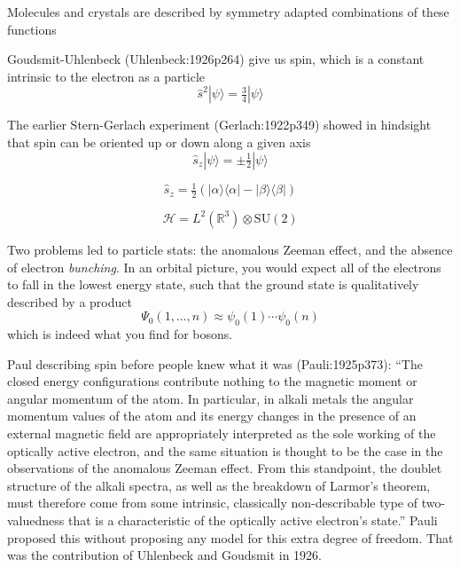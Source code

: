 \noindent
Molecules and crystals are described by symmetry adapted combinations of these
functions


Goudsmit-Uhlenbeck (Uhlenbeck:1926p264) give us spin, which is a constant intrinsic to the electron
as a particle
\begin{equation}
    \hat{s}^2
    |\psi\rangle
    =
    \tfrac{3}{4}
    |\psi\rangle
\end{equation}

The earlier Stern-Gerlach experiment (Gerlach:1922p349) showed in hindsight that
spin can be oriented up or down along a given axis
\begin{equation}
    \hat{s}_z
    |\psi\rangle
    =
    \pm
    \tfrac{1}{2}
    |\psi\rangle
\end{equation}

\begin{equation}
    \hat{s}_z
    =
    \tfrac{1}{2}
    (
        |\alpha\rangle\langle\alpha|
        -
        |\beta\rangle\langle\beta|
    )
\end{equation}

\begin{equation}
    \mathcal{H}
    =
    L^2(\mathbb{R}^3)
    \otimes
    \mathrm{SU}(2)
\end{equation}


Two problems led to particle stats: the anomalous Zeeman effect, and the absence
of electron {\itshape bunching}.
In an orbital picture, you would expect all of the electrons to fall in the
lowest energy state, such that the ground state is qualitatively described by a
product
\begin{equation}
    \Psi_0(1,\ldots,n)
    \approx
    \psi_0(1)
    \cdots
    \psi_0(n)
\end{equation}
which is indeed what you find for bosons.

Paul describing spin before people knew what it was (Pauli:1925p373):
``The closed energy configurations contribute nothing to the magnetic moment or
angular momentum of the atom.
In particular, in alkali metals the angular momentum values of the atom and its
energy changes in the presence of an external magnetic field are appropriately
interpreted as the sole working of the optically active electron, and the same
situation is thought to be the case in the observations of the anomalous Zeeman
effect.
From this standpoint, the doublet structure of the alkali spectra, as well as
the breakdown of Larmor's theorem, must therefore come from some intrinsic,
classically non-describable type of two-valuedness that is a characteristic of
the optically active electron's state.''
Pauli proposed this without proposing any model for this extra degree of
freedom.
That was the contribution of Uhlenbeck and Goudsmit in 1926.


